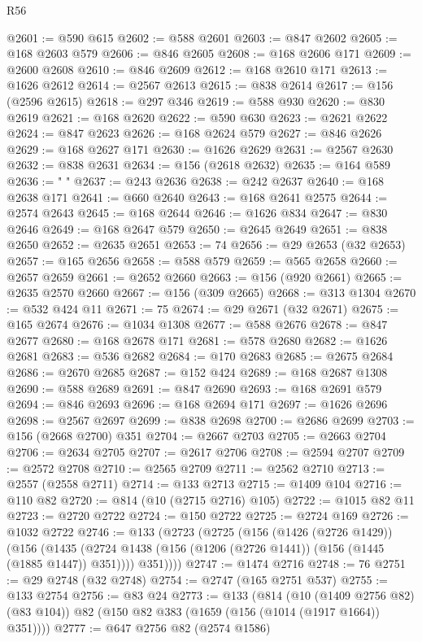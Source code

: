 \begin{lexlean}{R56}
\begin{coremodule}
{{{{{{{{{{{{{{{{{{{{{{{{{{{{{{{{{{{{{{{{{{{{{{{{{{{{{{{{{{{{{{{{{{{{{{{{{{{{{{{{{{{{{{{{{{{{{{{{{{{{{{{{{{{{{{{{{{{{{{{{{{{{{{{{{{{{{{{{{{{{{{{{{{{{{{{{{{{{{{{{{{{{{{{{{{{{{{{{{{{{{{{{{{{{{{{{{{{{{{{{{{{{{{{{{{{@2601 := @590 @615
@2602 := @588 @2601
@2603 := @847 @2602
@2605 := @168 @2603 @579
@2606 := @846 @2605
@2608 := @168 @2606 @171
@2609 := @2600 @2608
@2610 := @846 @2609
@2612 := @168 @2610 @171
@2613 := @1626 @2612
@2614 := @2567 @2613
@2615 := @838 @2614
@2617 := @156 (@2596 @2615)
@2618 := @297 @346
@2619 := @588 @930
@2620 := @830 @2619
@2621 := @168 @2620
@2622 := @590 @630
@2623 := @2621 @2622
@2624 := @847 @2623
@2626 := @168 @2624 @579
@2627 := @846 @2626
@2629 := @168 @2627 @171
@2630 := @1626 @2629
@2631 := @2567 @2630
@2632 := @838 @2631
@2634 := @156 (@2618 @2632)
@2635 := @164 @589
@2636 := " "
@2637 := @243 @2636
@2638 := @242 @2637
@2640 := @168 @2638 @171
@2641 := @660 @2640
@2643 := @168 @2641 @2575
@2644 := @2574 @2643
@2645 := @168 @2644
@2646 := @1626 @834
@2647 := @830 @2646
@2649 := @168 @2647 @579
@2650 := @2645 @2649
@2651 := @838 @2650
@2652 := @2635 @2651
@2653 := 74
@2656 := @29 @2653 (@32 @2653)
@2657 := @165 @2656
@2658 := @588 @579
@2659 := @565 @2658
@2660 := @2657 @2659
@2661 := @2652 @2660
@2663 := @156 (@920 @2661)
@2665 := @2635 @2570 @2660
@2667 := @156 (@309 @2665)
@2668 := @313 @1304
@2670 := @532 @424 @11
@2671 := 75
@2674 := @29 @2671 (@32 @2671)
@2675 := @165 @2674
@2676 := @1034 @1308
@2677 := @588 @2676
@2678 := @847 @2677
@2680 := @168 @2678 @171
@2681 := @578 @2680
@2682 := @1626 @2681
@2683 := @536 @2682
@2684 := @170 @2683
@2685 := @2675 @2684
@2686 := @2670 @2685
@2687 := @152 @424
@2689 := @168 @2687 @1308
@2690 := @588 @2689
@2691 := @847 @2690
@2693 := @168 @2691 @579
@2694 := @846 @2693
@2696 := @168 @2694 @171
@2697 := @1626 @2696
@2698 := @2567 @2697
@2699 := @838 @2698
@2700 := @2686 @2699
@2703 := @156 (@2668 @2700) @351
@2704 := @2667 @2703
@2705 := @2663 @2704
@2706 := @2634 @2705
@2707 := @2617 @2706
@2708 := @2594 @2707
@2709 := @2572 @2708
@2710 := @2565 @2709
@2711 := @2562 @2710
@2713 := @2557 (@2558 @2711)
@2714 := @133 @2713
@2715 := @1409 @104
@2716 := @110 @82
@2720 := @814 (@10 (@2715 @2716) @105)
@2722 := @1015 @82 @11
@2723 := @2720 @2722
@2724 := @150 @2722
@2725 := @2724 @169
@2726 := @1032 @2722
@2746 := @133
    (@2723
      (@2725
        (@156
          (@1426 (@2726 @1429))
          (@156
            (@1435 (@2724 @1438 (@156 (@1206 (@2726 @1441)) (@156 (@1445 (@1885 @1447)) @351))))
            @351))))
@2747 := @1474 @2716
@2748 := 76
@2751 := @29 @2748 (@32 @2748)
@2754 := @2747 (@165 @2751 @537)
@2755 := @133 @2754
@2756 := @83 @24
@2773 := @133
    (@814
      (@10 (@1409 @2756 @82) (@83 @104))
      @82
      (@150 @82 @383 (@1659 (@156 (@1014 (@1917 @1664)) @351))))
@2777 := @647 @2756 @82 (@2574 @1586)
}}}}}}}}}}}}}}}}}}}}}}}}}}}}}}}}}}}}}}}}}}}}}}}}}}}}}}}}}}}}}}}}}}}}}}}}}}}}}}}}}}}}}}}}}}}}}}}}}}}}}}}}}}}}}}}}}}}}}}}}}}}}}}}}}}}}}}}}}}}}}}}}}}}}}}}}}}}}}}}}}}}}}}}}}}}}}}}}}}}}}}}}}}}}}}}}}}}}}}}}}}}}}}}}}}}
\end{coremodule}
\end{lexlean}
